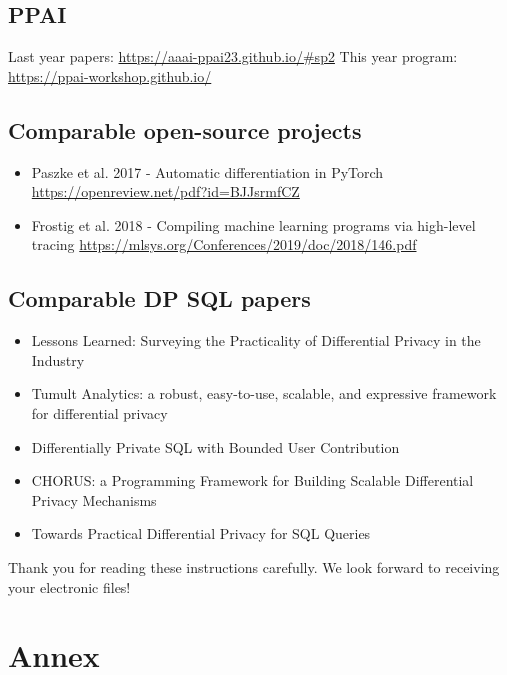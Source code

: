 \documentclass[letterpaper]{article} %
\begin{document}
\subsection{PPAI}
Last year papers:
\url{https://aaai-ppai23.github.io/#sp2}
This year program:
\url{https://ppai-workshop.github.io/}

\subsection{Comparable open-source projects}

\begin{itemize}
    \item Paszke et al. 2017 - Automatic differentiation in PyTorch \url{https://openreview.net/pdf?id=BJJsrmfCZ}
    \item Frostig et al. 2018 - Compiling machine learning programs via high-level tracing \url{https://mlsys.org/Conferences/2019/doc/2018/146.pdf}
\end{itemize}

\subsection{Comparable DP SQL papers}

\begin{itemize}
    \item Lessons Learned: Surveying the Practicality of Differential Privacy in the Industry \cite{garrido2022lessons}
    \item Tumult Analytics: a robust, easy-to-use, scalable, and expressive framework for differential privacy \cite{berghel2022tumult}
    \item Differentially Private SQL with Bounded User Contribution \cite{wilson2019differentially}
    \item CHORUS: a Programming Framework for Building Scalable Differential Privacy Mechanisms \cite{johnson2020chorus}
    \item Towards Practical Differential Privacy for SQL Queries \cite{johnson2018towards}
\end{itemize}

\bigskip
\noindent Thank you for reading these instructions carefully. We look forward to receiving your electronic files!

% 



\appendix

\section*{Annex}
\end{document}

